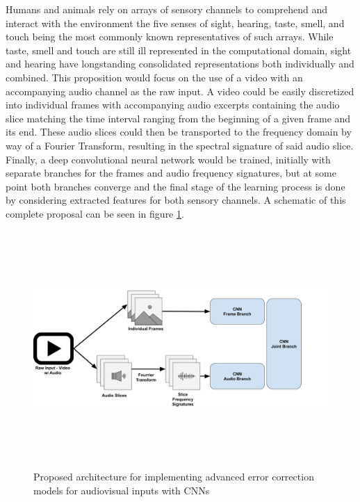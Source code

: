 \documentclass[10pt]{article}
\begin{document}
    Humans and animals rely on arrays of sensory channels to comprehend and interact with the environment the five senses of sight, hearing, taste, smell, and touch being the most commonly known representatives of such arrays. While taste, smell and touch are still ill represented in the computational domain, sight and hearing have longstanding consolidated representations both individually and combined. This proposition would focus on the use of a video with an accompanying audio channel as the raw input. A video could be easily discretized into individual frames with accompanying audio excerpts containing the audio slice matching the time interval ranging from the beginning of a given frame and its end. These audio slices could then be transported to the frequency domain by way of a Fourier Transform, resulting in the spectral signature of said audio slice. Finally, a deep convolutional neural network would be trained, initially with separate branches for the frames and audio frequency signatures, but at some point both branches converge and the final stage of the learning process is done by considering extracted features for both sensory channels. A schematic of this complete proposal can be seen in figure \ref{fig:proposal}.

    \begin{figure}[h]
        \centering
        \includegraphics[height=9cm]{Images/proposal/architecture.png}
        \caption{Proposed architecture for implementing advanced error correction models for audiovisual inputs with CNNs}
        \label{fig:proposal}
    \end{figure}
\end{document}
